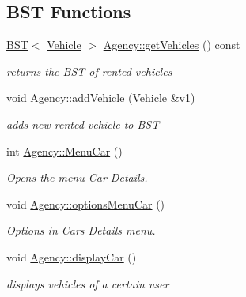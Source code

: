 \subsection*{B\+ST Functions}
\begin{DoxyCompactItemize}
\item 
\hyperlink{class_b_s_t}{B\+ST}$<$ \hyperlink{class_vehicle}{Vehicle} $>$ \hyperlink{group___agency_gaf7b06f6c289c6c6a7acf09dda8a6f7d5}{Agency\+::get\+Vehicles} () const
\begin{DoxyCompactList}\small\item\em returns the \hyperlink{class_b_s_t}{B\+ST} of rented vehicles \end{DoxyCompactList}\item 
void \hyperlink{group___agency_gab2a08b75fbe909173d539d27a06c7bc9}{Agency\+::add\+Vehicle} (\hyperlink{class_vehicle}{Vehicle} \&v1)
\begin{DoxyCompactList}\small\item\em adds new rented vehicle to \hyperlink{class_b_s_t}{B\+ST} \end{DoxyCompactList}\item 
\mbox{\label{group___agency_ga1273a762d40c0519e9382238341fa579}} 
int \hyperlink{group___agency_ga1273a762d40c0519e9382238341fa579}{Agency\+::\+Menu\+Car} ()
\begin{DoxyCompactList}\small\item\em Opens the menu Car Details. \end{DoxyCompactList}\item 
\mbox{\label{group___agency_gaba16b0f3b2db9c70e5a54eef91e0765d}} 
void \hyperlink{group___agency_gaba16b0f3b2db9c70e5a54eef91e0765d}{Agency\+::options\+Menu\+Car} ()
\begin{DoxyCompactList}\small\item\em Options in Cars Details menu. \end{DoxyCompactList}\item 
\mbox{\label{group___agency_ga9416585f65eeab4b7ac1071d5d4de036}} 
void \hyperlink{group___agency_ga9416585f65eeab4b7ac1071d5d4de036}{Agency\+::display\+Car} ()
\begin{DoxyCompactList}\small\item\em displays vehicles of a certain user \end{DoxyCompactList}\item 

\end{DoxyCompactItemize}
